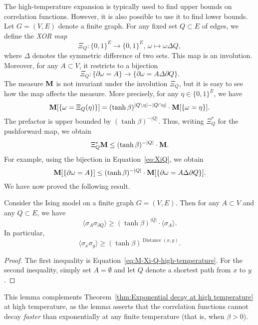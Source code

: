 The high-temperature expansion is typically used to find upper bounds on correlation
functions.
However, it is also possible to use it to find lower bounds.
Let $G=(V,E)$ denote a finite graph.
For any fixed set $Q\subset E$ of edges,
we define the \emph{XOR map}
\[
    \Xi_Q:\{0,1\}^E\to\{0,1\}^E,\,\omega\mapsto\omega\Delta Q,
\]
where $\Delta$ denotes the symmetric difference of two sets.
This map is an involution.
Moreover, for any $A\subset V$, it restricts to a bijection
\begin{equation}
    \label{eq:XiQ}
\Xi_Q:
\{\partial\omega=A\}\to\{\partial\omega=A\Delta\partial Q\}.
\end{equation}
The measure $\mathbf{M}$ is not invariant under the involution $\Xi_Q$,
but it is easy to see how the map affects the measure.
More precisely, for any $\eta\in\{0,1\}^E$, we have
\begin{equation}
    \label{eq:reweighting}
    \bfM[\{\omega = \Xi_Q(\eta)\}]
    =
    (\tanh\beta)^{|Q\setminus\eta|-|Q\cap\eta|}
    \cdot
    \bfM[\{\omega = \eta\}].
\end{equation}
The prefactor is upper bounded by $(\tanh\beta)^{-|Q|}$.
Thus, writing $\Xi_Q^*$ for the pushforward map,
we obtain
\[
    \Xi_Q^*\mathbf{M}\leq (\tanh\beta)^{-|Q|}
    \cdot
    \mathbf{M}.
\]
For example, using the bijection in Equation~\eqref{eq:XiQ},
we obtain
\begin{equation}
    \label{eq:M-Xi-Q-high-temperature}
    \bfM[\{\partial\omega=A\}]
    \leq
    (\tanh\beta)^{-|Q|}
    \cdot
    \bfM[\{\partial\omega=A\Delta\partial Q\}].
\end{equation}
We have now proved the following result.

\begin{lemma}
    \label{lemma:high-temperature}
    Consider the Ising model on a finite graph $G=(V,E)$.
    Then for any $A\subset V$ and any $Q\subset E$, we have
    \[
        \langle\sigma_A\sigma_{\partial Q}\rangle
        \geq
        (\tanh\beta)^{|Q|}\cdot\langle\sigma_A\rangle.
    \]
    In particular,
    \[
        \langle\sigma_x\sigma_y\rangle
        \geq
        (\tanh\beta)^{\operatorname{Distance}(x,y)}.
    \]
\end{lemma}

\begin{proof}
    The first inequality is Equation~\eqref{eq:M-Xi-Q-high-temperature}.
    For the second inequality, simply set $A=\emptyset$
    and let $Q$ denote a shortest path from $x$ to $y$.
\end{proof}

This lemma complements Theorem~\ref{thm:Exponential decay at high temperature}
at high temperature, as the lemma asserts that the correlation functions cannot
decay \emph{faster} than exponentially at any finite temperature
(that is, when $\beta>0$).

